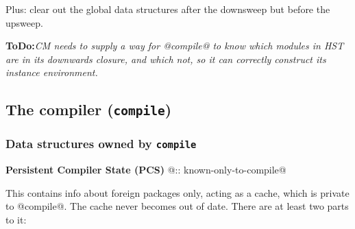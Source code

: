 \documentclass[11pt]{article}
\newcommand{\ToDo}[1]{{{\bf ToDo:}\sl #1}}
\begin{document}
Plus: clear out the global data structures after the downsweep but
before the upsweep.

\ToDo{CM needs to supply a way for @compile@ to know which modules in
      HST are in its downwards closure, and which not, so it can
      correctly construct its instance environment.}



\subsection{The compiler (\mbox{\tt compile})}
\label{sec:compiler}

\subsubsection{Data structures owned by \mbox{\tt compile}}

   {\bf Persistent Compiler State (PCS)} @:: known-only-to-compile@

   This contains info about foreign packages only, acting as a cache,
   which is private to @compile@.  The cache never becomes out of
   date.  There are at least two parts to it:
\end{document}
